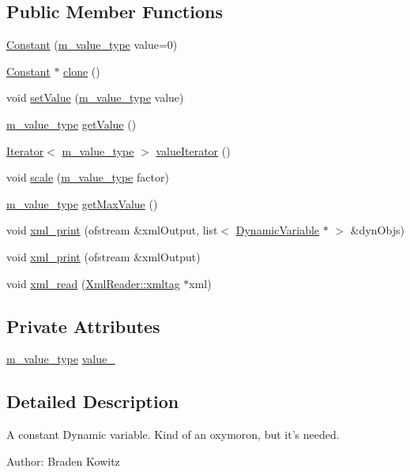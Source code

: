 \subsection*{Public Member Functions}
\begin{CompactItemize}
\item 
\hyperlink{classConstant_a0}{Constant} (\hyperlink{Types_8h_a3}{m\_\-value\_\-type} value=0)
\item 
\hyperlink{classConstant}{Constant} $\ast$ \hyperlink{classConstant_a1}{clone} ()
\item 
void \hyperlink{classConstant_a2}{set\-Value} (\hyperlink{Types_8h_a3}{m\_\-value\_\-type} value)
\item 
\hyperlink{Types_8h_a3}{m\_\-value\_\-type} \hyperlink{classConstant_a3}{get\-Value} ()
\item 
\hyperlink{classIterator}{Iterator}$<$ \hyperlink{Types_8h_a3}{m\_\-value\_\-type} $>$ \hyperlink{classConstant_a4}{value\-Iterator} ()
\item 
void \hyperlink{classConstant_a5}{scale} (\hyperlink{Types_8h_a3}{m\_\-value\_\-type} factor)
\item 
\hyperlink{Types_8h_a3}{m\_\-value\_\-type} \hyperlink{classConstant_a6}{get\-Max\-Value} ()
\item 
void \hyperlink{classConstant_a7}{xml\_\-print} (ofstream \&xml\-Output, list$<$ \hyperlink{classDynamicVariable}{Dynamic\-Variable} $\ast$ $>$ \&dyn\-Objs)
\item 
void \hyperlink{classConstant_a8}{xml\_\-print} (ofstream \&xml\-Output)
\item 
void \hyperlink{classConstant_a9}{xml\_\-read} (\hyperlink{classXmlReader_1_1xmltag}{Xml\-Reader::xmltag} $\ast$xml)
\end{CompactItemize}
\subsection*{Private Attributes}
\begin{CompactItemize}
\item 
\hyperlink{Types_8h_a3}{m\_\-value\_\-type} \hyperlink{classConstant_r0}{value\_\-}
\end{CompactItemize}


\subsection{Detailed Description}
A constant Dynamic variable. Kind of an oxymoron, but it's needed. \begin{Desc}
\item[Author:]Braden Kowitz \end{Desc}




